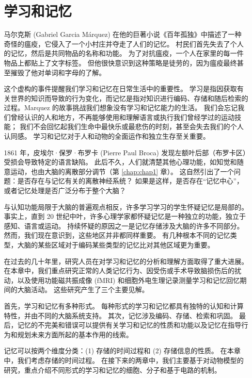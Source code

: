\chapter{学习和记忆} \label{chap:chap52}

马尔克斯 (Gabriel Garcia Márquez) 在他的巨著小说《百年孤独》中描述了一种奇怪的瘟疫，它侵入了一个小村庄并夺走了人们的记忆。
村民们首先失去了个人的记忆，然后是共同物品的名称和功能。
为了对抗瘟疫，一个人在家里的每一件物品上都贴上了文字标签。
但他很快意识到这种策略是徒劳的，因为瘟疫最终甚至摧毁了他对单词和字母的了解。


这个虚构的事件提醒我们学习和记忆在日常生活中的重要性。
学习是指因获取有关世界的知识而导致的行为变化，而记忆是指对知识进行编码、存储和随后检索的过程。Marquez 的故事挑战我们想象没有学习和记忆能力的生活。
我们会忘记我们曾经认识的人和地方，不再能够使用和理解语言或执行我们曾经学过的运动技能；
我们不会回忆起我们生命中最快乐或最悲伤的时刻，甚至会失去我们的个人认同感。
学习和记忆对于人和动物的全面运作和独立生存至关重要。


1861 年，皮埃尔·保罗·布罗卡 (Pierre Paul Broca) 发现左额叶后部（布罗卡区）受损会导致特定的语言缺陷。
此后不久，人们就清楚其他心理功能，如知觉和随意运动，也由大脑的离散部分调节（第 \ref{chap:chap1} 章）。
这自然引出了一个问题：是否存在与记忆有关的离散神经系统？
如果是这样，是否存在“记忆中心”，或者记忆处理是否广泛分布于整个大脑？


与认知功能局限于大脑的普遍观点相反，许多学习学习的学生怀疑记忆是局部的。
事实上，直到 20 世纪中叶，许多心理学家都怀疑记忆是一种独立的功能，独立于感知、语言或运动。
持续怀疑的原因之一是记忆存储涉及大脑的许多不同部分。
然而，我们现在意识到，这些地区并非都同样重要。
有几种根本不同的记忆类型，大脑的某些区域对于编码某些类型的记忆比对其他区域更为重要。


在过去的几十年里，研究人员在对学习和记忆的分析和理解方面取得了重大进展。
在本章中，我们重点研究正常的人类记忆行为、因受伤或手术导致脑损伤后的扰动，以及使用功能磁共振成像 (fMRI) 和细胞外电生理记录测量学习和记忆回忆期间的大脑活动。
这些研究产生了三个主要见解。


首先，学习和记忆有多种形式。
每种形式的学习和记忆都具有独特的认知和计算特性，并由不同的大脑系统支持。
其次，记忆涉及编码、存储、检索和巩固。
最后，记忆的不完美和错误可以提供有关学习和记忆的性质和功能以及记忆在指导行为和规划未来方面所起的基本作用的线索。


记忆可以按两个维度分类：(1) 存储的时间过程和 (2) 存储信息的性质。
在本章中，我们考虑存储的时间过程。
在接下来的两章中，我们主要基于对动物模型的研究，重点介绍不同形式的学习和记忆的细胞、分子和基于电路的机制。



